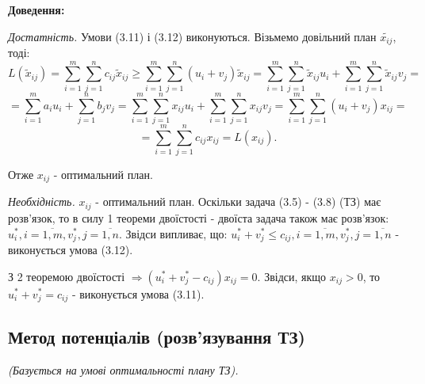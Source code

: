 \documentclass[12pt,a4paper]{book}
\begin{document}
{\bf Доведення:}

{\it Достатність.} Умови (3.11) і (3.12) виконуються. Візьмемо довільний план $\tilde{x_{ij}}$, тоді:\\
$$ L(\tilde{x}_{ij}) = \sum_{i=1}^m \sum_{j=1}^n c_{ij} \tilde{x}_{ij} \geq
 \sum_{i=1}^m \sum_{j=1}^n (u_i+v_j) \tilde{x}_{ij} = 
 \sum_{i=1}^m \sum_{j=1}^n \tilde{x}_{ij} u_i + \sum_{i=1}^m \sum_{j=1}^n  \tilde{x}_{ij} v_j = $$
$$ = \sum_{i=1}^m a_i u_i + \sum_{j=1}^n b_j v_j =
 \sum_{i=1}^m \sum_{j=1}^n x_{ij} u_i + \sum_{i=1}^m \sum_{j=1}^n  x_{ij} v_j =
 \sum_{i=1}^m \sum_{j=1}^n (u_i+v_j) x_{ij} = $$
$$ = \sum_{i=1}^m \sum_{j=1}^n c_{ij} x_{ij} = L(x_{ij}). $$

Отже $x_{ij}$ - оптимальний план.

{\it Необхідність.} $x_{ij}$ - оптимальний план. Оскільки задача (3.5) - (3.8) (ТЗ) має розв’язок, то в силу 1 теореми двоїстості - двоїста задача також має розв’язок: $u^*_i, i = \overline{1,m}, v^*_j, j= \overline{1,n}$. Звідси випливає, що: $u^*_i+v^*_j \le c_{ij}, i = \overline{1,m}, v^*_j, j= \overline{1,n}$ - виконується умова (3.12).

З 2 теоремою двоїстості $\Rightarrow (u^*_i + v^*_j - c_{ij})x_{ij}=0$. Звідси, якщо $x_{ij}>0$, то $u^*_i + v^*_j = c_{ij}$ - виконується умова (3.11).

\subsection{Метод потенціалів (розв’язування ТЗ)}

\emph{(Базується на умові оптимальності плану ТЗ).}
\end{document}
